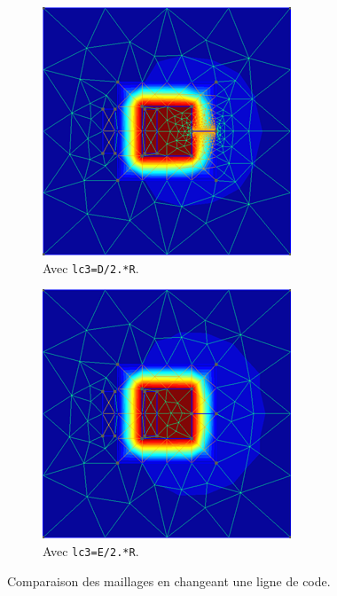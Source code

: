 \documentclass[11pt]{article}
\begin{document}
\begin{figure}[H]
	\centering
	\begin{subfigure}{0.33\textwidth}
		\centering
		\includegraphics[width=\linewidth]{mesh1.png}
		\caption{Avec \texttt{lc3=D/2.*R}.}
		\label{fig:mesh1}
	\end{subfigure}\hspace{3cm}
	\begin{subfigure}{0.33\textwidth}
		\centering
		\includegraphics[width=\linewidth]{mesh2.png}
		\caption{Avec \texttt{lc3=E/2.*R}.}
		\label{fig:mesh2}
	\end{subfigure}
	\caption{Comparaison des maillages en changeant une ligne de code.}
	\label{fig:mesh}
\end{figure}
\end{document}
